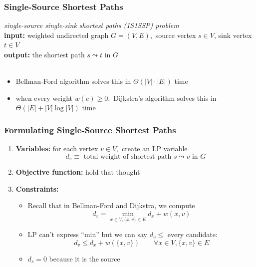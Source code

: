 \documentclass{beamer}
\newcommand{\stanza}{ \\~\ }
\begin{document}
\begin{frame} \frametitle{Single-Source Shortest Paths}
  \emph{single-source single-sink shortest paths (1S1SSP) problem} \\
  \textbf{input:} weighted undirected graph $G=(V,E),$ source vertex $s \in V$,
    sink vertex $t \in V$\\
  \textbf{output:} the shortest path $s \leadsto t$ in $G$ \stanza

  \begin{itemize}
    \item Bellman-Ford algorithm solves this in $\Theta(|V| \cdot |E|)$ time
    \item when every weight $w(e) \geq 0,$ Dijkstra's algorithm solves this
      in $\Theta(|E| + |V| \log |V|)$ time
  \end{itemize}
\end{frame}

\begin{frame} \frametitle{Formulating Single-Source Shortest Paths}
\begin{enumerate}
  \item \textbf{Variables:} for each vertex $v \in V,$ create an LP variable
  \[ d_v \equiv \text{ total weight of shortest path } s \leadsto v \text{ in } G \]
  \item \textbf{Objective function:} hold that thought
  \item \textbf{Constraints:}
  \begin{itemize}
    \item Recall that in Bellman-Ford and Dijkstra, we compute
    \[ d_v = \min_{x \in V, \{x, v\} \in E} d_x + w({x, v}) \]
    \item LP can't express ``min'' but we can say $d_v \leq$ every candidate:
    \[ d_v \leq d_x + w(\{x, v\}) \qquad \forall x \in V, \{x, v\} \in E \]
    \item $d_s = 0$ because it is the source
  \end{itemize}
\end{enumerate}
\end{frame}
\end{document}
